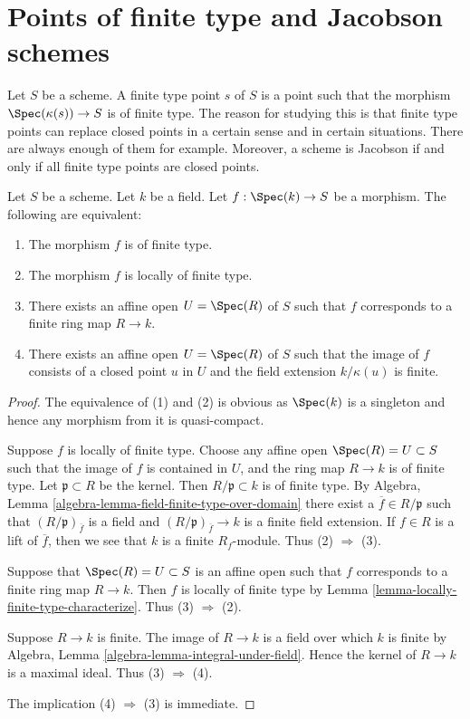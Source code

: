 \section{Points of finite type and Jacobson schemes}
\label{section-points-finite-type}

\noindent
Let $S$ be a scheme. A finite type point $s$ of $S$ is a point such
that the morphism $\Spec(\kappa(s)) \to S$ is of finite type.
The reason for studying this is that finite type points can replace
closed points in a certain sense and in certain situations.
There are always enough of them for example. Moreover, a scheme
is Jacobson if and only if all finite type points are closed points.

\begin{lemma}
\label{lemma-point-finite-type}
Let $S$ be a scheme. Let $k$ be a field.
Let $f : \Spec(k) \to S$ be a morphism.
The following are equivalent:
\begin{enumerate}
\item The morphism $f$ is of finite type.
\item The morphism $f$ is locally of finite type.
\item There exists an affine open $U = \Spec(R)$ of $S$
such that $f$ corresponds to a finite ring map $R \to k$.
\item There exists an affine open $U = \Spec(R)$ of $S$
such that the image of $f$ consists of a closed point $u$ in $U$
and the field extension $k/\kappa(u)$ is finite.
\end{enumerate}
\end{lemma}

\begin{proof}
The equivalence of (1) and (2) is obvious as $\Spec(k)$
is a singleton and hence any morphism from it is quasi-compact.

\medskip\noindent
Suppose $f$ is locally of finite type. Choose any affine open
$\Spec(R) = U \subset S$ such that the image of $f$
is contained in $U$, and the ring map $R \to k$
is of finite type. Let $\mathfrak p \subset R$ be the kernel.
Then $R/\mathfrak p \subset k$ is of finite type. By
Algebra, Lemma \ref{algebra-lemma-field-finite-type-over-domain}
there exist a $\overline{f} \in R/\mathfrak p$ such that
$(R/\mathfrak p)_{\overline{f}}$ is a field and
$(R/\mathfrak p)_{\overline{f}} \to k$ is a finite field
extension. If $f \in R$ is a lift of $\overline{f}$, then
we see that $k$ is a finite $R_f$-module. Thus (2) $\Rightarrow$ (3).

\medskip\noindent
Suppose that $\Spec(R) = U \subset S$ is an affine open
such that $f$ corresponds to a finite ring map $R \to k$.
Then $f$ is locally of finite type
by Lemma \ref{lemma-locally-finite-type-characterize}.
Thus (3) $\Rightarrow$ (2).

\medskip\noindent
Suppose $R \to k$ is finite. The image of $R \to k$ is a field
over which $k$ is finite by
Algebra, Lemma \ref{algebra-lemma-integral-under-field}.
Hence the kernel of $R \to k$ is a maximal ideal.
Thus (3) $\Rightarrow$ (4).

\medskip\noindent
The implication (4) $\Rightarrow$ (3) is immediate.
\end{proof}

